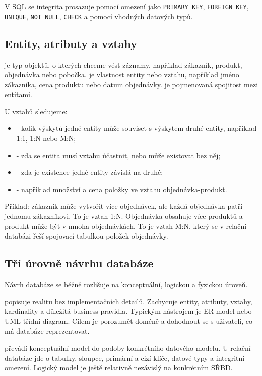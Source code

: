 V SQL se integrita prosazuje pomocí omezení jako \texttt{PRIMARY KEY}, \texttt{FOREIGN KEY},
\texttt{UNIQUE}, \texttt{NOT NULL}, \texttt{CHECK} a pomocí vhodných datových typů.

\subsection{Entity, atributy a vztahy}
 je typ objektů, o kterých chceme vést záznamy, například zákazník, produkt, objednávka
nebo pobočka.  je vlastnost entity nebo vztahu, například jméno zákazníka, cena produktu
nebo datum objednávky.  je pojmenovaná spojitost mezi entitami.

U vztahů sledujeme:
\begin{itemize}
  \item {} - kolik výskytů jedné entity může souviset s výskytem druhé entity,
  například 1:1, 1:N nebo M:N;
  \item {} - zda se entita musí vztahu účastnit, nebo může existovat bez něj;
  \item {} - zda je existence jedné entity závislá na druhé;
  \item {} - například množství a cena položky ve vztahu objednávka-produkt.
\end{itemize}

Příklad: zákazník může vytvořit více objednávek, ale každá objednávka patří jednomu zákazníkovi.
To je vztah 1:N. Objednávka obsahuje více produktů a produkt může být v mnoha objednávkách. To je
vztah M:N, který se v relační databázi řeší spojovací tabulkou položek objednávky.

\subsection{Tři úrovně návrhu databáze}
Návrh databáze se běžně rozlišuje na konceptuální, logickou a fyzickou úroveň.

 popisuje realitu bez implementačních detailů. Zachycuje entity, atributy,
vztahy, kardinality a důležitá business pravidla. Typickým nástrojem je ER model nebo UML třídní
diagram. Cílem je porozumět doméně a dohodnout se s uživateli, co má databáze reprezentovat.

 převádí konceptuální model do podoby konkrétního datového modelu. U relační
databáze jde o tabulky, sloupce, primární a cizí klíče, datové typy a integritní omezení. Logický
model je ještě relativně nezávislý na konkrétním SŘBD.

